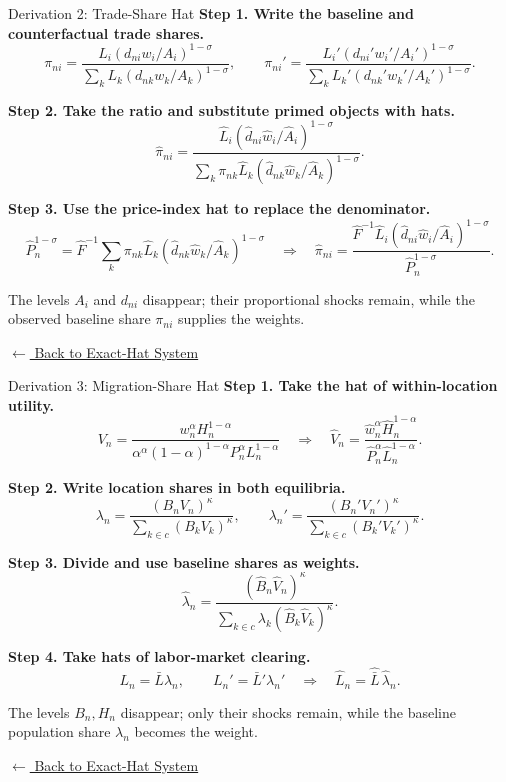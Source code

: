 \documentclass[aspectratio=169,11pt]{beamer}
\newcommand{\B}[1]{\textcolor{blue1}{\textbf{#1}}}
\newcommand{\wh}[1]{\widehat{#1}}
\newcommand{\backlink}[2]{%
  \hyperlink{#1}{\textcolor{blue1}{\footnotesize
  \(\longleftarrow\) #2}}}
\begin{document}
\begin{frame}[t,label=deriveHatTrade]{Derivation 2: Trade-Share Hat}
  \scriptsize
  \setlength{\abovedisplayskip}{3pt}
  \setlength{\belowdisplayskip}{3pt}
  \B{Step 1. Write the baseline and counterfactual trade shares.}
  \[
    \pi_{ni}
      =\frac{L_i(d_{ni}w_i/A_i)^{1-\sigma}}
      {\sum_kL_k(d_{nk}w_k/A_k)^{1-\sigma}},
    \qquad
    \pi_{ni}'
      =\frac{L_i'(d_{ni}'w_i'/A_i')^{1-\sigma}}
      {\sum_kL_k'(d_{nk}'w_k'/A_k')^{1-\sigma}}.
  \]

  \B{Step 2. Take the ratio and substitute primed objects with hats.}
  \[
    \wh\pi_{ni}
    =\frac{\wh L_i(\wh d_{ni}\wh w_i/\wh A_i)^{1-\sigma}}
      {\sum_k\pi_{nk}\wh L_k
      (\wh d_{nk}\wh w_k/\wh A_k)^{1-\sigma}}.
  \]

  \B{Step 3. Use the price-index hat to replace the denominator.}
  \[
    \wh P_n^{1-\sigma}
      =\wh F^{-1}\sum_k\pi_{nk}\wh L_k
      (\wh d_{nk}\wh w_k/\wh A_k)^{1-\sigma}
    \quad\Longrightarrow\quad
    \wh\pi_{ni}
    =\frac{\wh F^{-1}\wh L_i
      (\wh d_{ni}\wh w_i/\wh A_i)^{1-\sigma}}
      {\wh P_n^{1-\sigma}}.
  \]

  The levels \(A_i\) and \(d_{ni}\) disappear; their proportional shocks remain,
  while the observed baseline share \(\pi_{ni}\) supplies the weights.

  \vfill
  \hfill\backlink{mainHatSystem}{Back to Exact-Hat System}
\end{frame}

\begin{frame}[t,label=deriveHatMigration]{Derivation 3: Migration-Share Hat}
  \footnotesize
  \B{Step 1. Take the hat of within-location utility.}
  \[
    V_n=
      \frac{w_n^\alpha H_n^{1-\alpha}}
      {\alpha^\alpha(1-\alpha)^{1-\alpha}
      P_n^\alpha L_n^{1-\alpha}}
    \quad\Longrightarrow\quad
    \wh V_n
      =
      \frac{\wh w_n^\alpha\wh H_n^{1-\alpha}}
      {\wh P_n^\alpha\wh L_n^{1-\alpha}}.
  \]

  \B{Step 2. Write location shares in both equilibria.}
  \[
    \lambda_n=\frac{(B_nV_n)^\kappa}
      {\sum_{k\in c}(B_kV_k)^\kappa},
    \qquad
    \lambda_n'=\frac{(B_n'V_n')^\kappa}
      {\sum_{k\in c}(B_k'V_k')^\kappa}.
  \]

  \B{Step 3. Divide and use baseline shares as weights.}
  \[
    \wh\lambda_n
    =\frac{(\wh B_n\wh V_n)^\kappa}
      {\sum_{k\in c}\lambda_k
      (\wh B_k\wh V_k)^\kappa}.
  \]

  \B{Step 4. Take hats of labor-market clearing.}
  \[
    L_n=\bar L\lambda_n,
    \qquad
    L_n'=\bar L'\lambda_n'
    \quad\Longrightarrow\quad
    \wh L_n=\wh{\bar L}\,\wh\lambda_n.
  \]

  The levels \(B_n,H_n\) disappear; only their shocks remain, while the
  baseline population share \(\lambda_n\) becomes the weight.

  \vfill
  \hfill\backlink{mainHatSystem}{Back to Exact-Hat System}
\end{frame}
\end{document}

